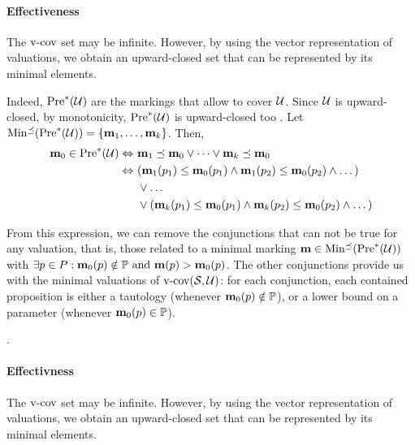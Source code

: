 \paragraph{Effectiveness}
The $\operatorname{v-cov}$ set may be infinite.
However,
by using the vector representation of valuations, we obtain an upward-closed set that can be represented by its minimal elements.

Indeed,
$\operatorname{Pre}^*_{}(\mathcal{U})$ are the markings that allow to cover $\mathcal{U}$.
Since $\mathcal{U}$ is upward-closed, by monotonicity, $\operatorname{Pre}^*_{}(\mathcal{U})$ is upward-closed too .
Let $\operatorname{Min^\preceq}(\operatorname{Pre}^*_{}(\mathcal{U})) = \{\mathbf{m}_1, \dots, \mathbf{m}_k\}$.
Then,
\begin{align*}
  \mathbf{m}_0 \in \operatorname{Pre}^*_{}(\mathcal{U}) \Leftrightarrow \ &
    \mathbf{m}_1 \preceq \mathbf{m}_0 \vee \dots \vee \mathbf{m}_k \preceq \mathbf{m}_0 \\
  \Leftrightarrow \ &
    (\mathbf{m}_1(p_1) \leq \mathbf{m}_0(p_1) \wedge \mathbf{m}_1(p_2) \leq \mathbf{m}_0(p_2) \wedge \dots) \\
  &\vee \dots \\
  &\vee
    (\mathbf{m}_k(p_1) \leq \mathbf{m}_0(p_1) \wedge \mathbf{m}_k(p_2) \leq \mathbf{m}_0(p_2) \wedge \dots)
\end{align*}

From this expression, we can remove the conjunctions that can not be true for any valuation, that is, those related to a minimal marking $\mathbf{m} \in \operatorname{Min^\preceq}(\operatorname{Pre}^*_{}(\mathcal{U}))$ with
\(
  \exists p \in P : \mathbf{m}_0(p) \notin \mathbb{P} \text{ and } \mathbf{m}(p) > \mathbf{m}_0(p)
\).
The other conjunctions provide us with the minimal valuations of $\operatorname{v-cov}(\mathcal{S}_{{}},\mathcal{U})$:
for each conjunction, each contained proposition is either a tautology (whenever $\mathbf{m}_0(p) \notin \mathbb{P}$), or a lower bound on a parameter (whenever $\mathbf{m}_0(p) \in \mathbb{P}$).

.


\paragraph{Effectivness}
The $\operatorname{v-cov}$ set may be infinite.
However,
by using the vector representation of valuations, we obtain an upward-closed set that can be represented by its minimal elements.

